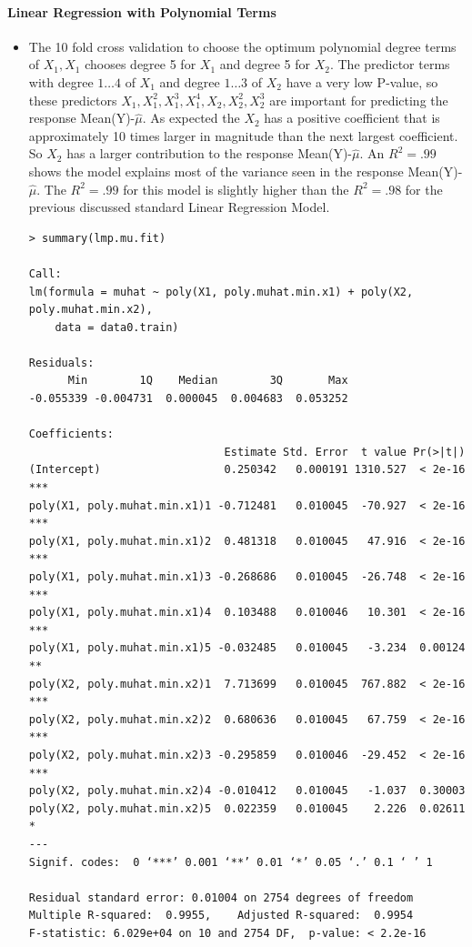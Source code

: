\documentclass[twoside,12pt]{article}
\begin{document}
\paragraph{Linear Regression with Polynomial Terms}
\begin{itemize}
\item
The 10 fold cross validation to choose the optimum polynomial degree terms of $X_1,X_1$ chooses degree 5 for $X_1$ and degree 5 for $X_2$. The predictor terms with degree $1\dots 4$ of $X_1$ and degree $1 \dots 3$ of $X_2$ have a very low P-value, so these predictors $X_1,X_1^2,X_1^3,X_1^4,X_2,X_2^2,X_2^3$ are important for predicting the response Mean(Y)-$\hat{\mu}$. As expected the $X_2$ has a positive coefficient that is approximately 10 times larger in magnitude than the next largest coefficient. So $X_2$ has a larger contribution to the response Mean(Y)-$\hat{\mu}$. An $R^2=.99$ shows the model explains most of the variance seen in the response Mean(Y)-$\hat{\mu}$. The $R^2=.99$ for this model is slightly higher than the $R^2=.98$ for the previous discussed standard Linear Regression Model.
\begin{verbatim}
> summary(lmp.mu.fit)

Call:
lm(formula = muhat ~ poly(X1, poly.muhat.min.x1) + poly(X2, poly.muhat.min.x2), 
    data = data0.train)

Residuals:
      Min        1Q    Median        3Q       Max 
-0.055339 -0.004731  0.000045  0.004683  0.053252 

Coefficients:
                              Estimate Std. Error  t value Pr(>|t|)    
(Intercept)                   0.250342   0.000191 1310.527  < 2e-16 ***
poly(X1, poly.muhat.min.x1)1 -0.712481   0.010045  -70.927  < 2e-16 ***
poly(X1, poly.muhat.min.x1)2  0.481318   0.010045   47.916  < 2e-16 ***
poly(X1, poly.muhat.min.x1)3 -0.268686   0.010045  -26.748  < 2e-16 ***
poly(X1, poly.muhat.min.x1)4  0.103488   0.010046   10.301  < 2e-16 ***
poly(X1, poly.muhat.min.x1)5 -0.032485   0.010045   -3.234  0.00124 ** 
poly(X2, poly.muhat.min.x2)1  7.713699   0.010045  767.882  < 2e-16 ***
poly(X2, poly.muhat.min.x2)2  0.680636   0.010045   67.759  < 2e-16 ***
poly(X2, poly.muhat.min.x2)3 -0.295859   0.010046  -29.452  < 2e-16 ***
poly(X2, poly.muhat.min.x2)4 -0.010412   0.010045   -1.037  0.30003    
poly(X2, poly.muhat.min.x2)5  0.022359   0.010045    2.226  0.02611 *  
---
Signif. codes:  0 ‘***’ 0.001 ‘**’ 0.01 ‘*’ 0.05 ‘.’ 0.1 ‘ ’ 1

Residual standard error: 0.01004 on 2754 degrees of freedom
Multiple R-squared:  0.9955,    Adjusted R-squared:  0.9954 
F-statistic: 6.029e+04 on 10 and 2754 DF,  p-value: < 2.2e-16


\end{verbatim}
\end{itemize}
\end{document}
